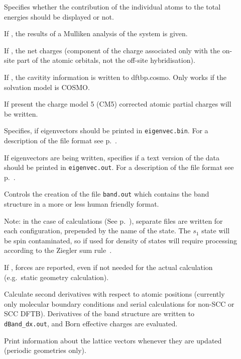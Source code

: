 \begin{description}

\item[] Specifies whether the contribution of the
  individual atoms to the total energies should be displayed or not.

\item[] If , the results of a Mulliken analysis of
  the system is given.

\item[] If , the net charges (component of the
  charge associated only with the on-site part of the atomic orbitals, not the
  off-site hybridisation).

\item[] If , the cavitity information is
  written to dftbp.cosmo. Only works if the solvation model is COSMO.

\item[] If present the charge model 5 (CM5)\cite{marenich2012} corrected
  atomic partial charges will be written.

\item[] Specifies, if eigenvectors should be printed in
  \verb|eigenvec.bin|. For a description of the file format see
  p.~.

\item[] If eigenvectors are being written, specifies if a
  text version of the data should be printed in \verb|eigenvec.out|. For a
  description of the file format see p.~.

\item[] Controls the creation of the file
  \verb|band.out| which contains the band structure in a more or less
  human friendly format.

  Note: in the case of  calculations (See
  p.~), separate files are written for each
  configuration, prepended by the name of the state. The $s_1$ state
  will be spin contaminated, so if used for density of states will
  require processing according to the Ziegler sum
  rule~\cite{baerends-TCA-43-261}.

\item[] If , forces are reported, even if not needed
  for the actual calculation (e.g.\ static geometry calculation).

\item[] Calculate second derivatives with respect
  to atomic positions (currently only molecular boundary conditions
  and serial calculations for non-SCC or SCC DFTB). Derivatives of the band
  structure are written to \verb|dBand_dx.out|, and Born effective
  charges are evaluated.

\item[] Print information about the
  lattice vectors whenever they are updated (periodic geometries only).

\end{description}


